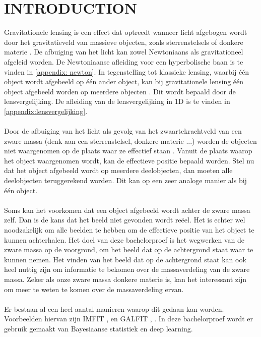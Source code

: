 \section{INTRODUCTION}
Gravitationele lensing is een effect dat optreedt wanneer licht afgebogen wordt door het gravitatieveld van massieve objecten, zoals sterrenstelsels of donkere materie \cite{informationesoorg-no-date}. De afbuiging van het licht kan zowel Newtoniaans als gravitationeel afgeleid worden. De Newtoniaanse afleiding voor een hyperbolische baan is te vinden in \cref{appendix: newton}. In tegenstelling tot klassieke lensing, waarbij één object wordt afgebeeld op één ander object, kan bij gravitationele lensing één object afgebeeld worden op meerdere objecten \cite{unknown-author-2022}. Dit wordt bepaald door de lensvergelijking. De afleiding van de lensvergelijking in 1D is te vinden in \cref{appendix:lensvergelijking}.\\ \\
Door de afbuiging van het licht als gevolg van het zwaartekrachtveld van een zware massa (denk aan een sterrenstelsel, donkere materie ...) 
worden de objecten niet waargenomen op de plaats waar ze effectief staan \cite{lea-2023}. Vanuit de plaats waarop het object waargenomen wordt, kan de effectieve positie bepaald worden. Stel nu dat het object afgebeeld wordt op meerdere deelobjecten, dan moeten alle deelobjecten teruggerekend worden. Dit kan op een zeer analoge manier als bij één object. \\ \\
Soms kan het voorkomen dat een object afgebeeld wordt achter de zware massa zelf. Dan is de kans dat het beeld niet gevonden wordt reëel. Het is echter wel noodzakelijk om alle beelden te hebben om de effectieve positie van het object te kunnen achterhalen. Het doel van deze bachelorproef is het wegwerken van de zware massa op de voorgrond, om het beeld dat op de achtergrond staat waar te kunnen nemen. Het vinden van het beeld dat op de achtergrond staat kan ook heel nuttig zijn om informatie te bekomen over de massaverdeling van de zware massa. Zeker als onze zware massa donkere materie is, kan het interessant zijn om meer te weten te komen over de massaverdeling ervan. \\ \\
Er bestaan al een heel aantal manieren waarop dit gedaan kan worden. Voorbeelden hiervan zijn IMFIT \cite{chen-2020}, \cite{erwin-2015} en GALFIT \cite{peng-2010}, \cite{unknown-author-no-date-galfit}.
In deze bachelorproef wordt er gebruik gemaakt van Bayesiaanse statistiek en deep learning.



